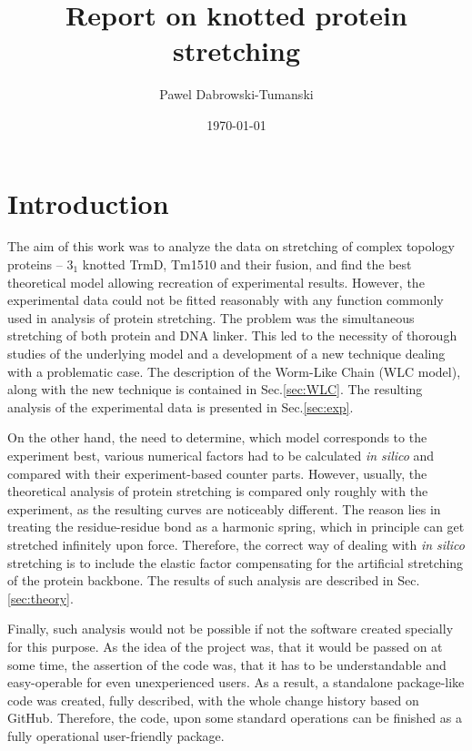 \documentclass[11pt]{article}
\title{Report on knotted protein stretching}
\author{Pawel Dabrowski-Tumanski}
\date{\today}
\begin{document}
\maketitle

\section*{Introduction}
\label{sec:intro}
The aim of this work was to analyze the data on stretching of complex topology proteins -- $3_1$ knotted TrmD, Tm1510 and their fusion, and find the best theoretical model allowing recreation of experimental results.
However, the experimental data could not be fitted reasonably with any function commonly used in analysis of protein stretching.
The problem was the simultaneous stretching of both protein and DNA linker.
This led to the necessity of thorough studies of the underlying model and a development of a new technique dealing with a problematic case.
The description of the Worm-Like Chain (WLC model), along with the new technique is contained in Sec.\ref{sec:WLC}.
The resulting analysis of the experimental data is presented in Sec.\ref{sec:exp}.

On the other hand, the need to determine, which model corresponds to the experiment best, various numerical factors had to be calculated \textit{in silico} and compared with their experiment-based counter parts.
However, usually, the theoretical analysis of protein stretching is compared only roughly with the experiment, as the resulting curves are noticeably different.
The reason lies in treating the residue-residue bond as a harmonic spring, which in principle can get stretched infinitely upon force.
Therefore, the correct way of dealing with \textit{in silico} stretching is to include the elastic factor compensating for the artificial stretching of the protein backbone.
The results of such analysis are described in Sec.\ref{sec:theory}.

Finally, such analysis would not be possible if not the software created specially for this purpose.
As the idea of the project was, that it would be passed on at some time, the assertion of the code was, that it has to be understandable and easy-operable for even unexperienced users.
As a result, a standalone package-like code was created, fully described, with the whole change history based on GitHub.
Therefore, the code, upon some standard operations can be finished as a fully operational user-friendly package.

\end{document}
